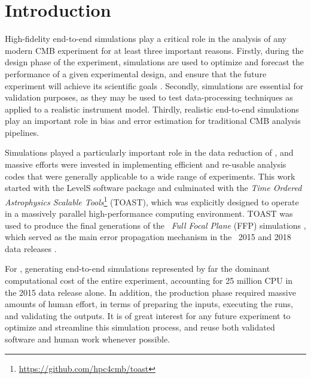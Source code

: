 \documentclass[twocolumn]{aa}%
\begin{document}
\tableofcontents
	


\section{Introduction}
\label{sec:introduction}
	
High-fidelity end-to-end simulations play a critical role in the
analysis of any modern CMB experiment for at least three important
reasons. Firstly, during the design phase of the experiment,
simulations are used to optimize and forecast the performance of a
given experimental design, and ensure that the future experiment will
achieve its scientific goals \citep[e.g.,][]{ptep}. Secondly,
simulations are essential for validation purposes, as they may be used
to test data-processing techniques as applied to a realistic
instrument model. Thirdly, realistic end-to-end simulations play an
important role in bias and error estimation for traditional CMB
analysis pipelines.

Simulations played a particularly important role in the data reduction
of \Planck, and massive efforts were invested in implementing
efficient and re-usable analysis codes that were generally applicable
to a wide range of experiments. This work started with the LevelS software package \citep{levelS} and culminated with the \emph{Time Ordered Astrophysics Scalable Tools}\footnote{\url{https://github.com/hpc4cmb/toast}}
(TOAST), which was
explicitly designed to operate in a massively parallel
high-performance computing environment. TOAST was used to produce the
final generations of the \Planck\ \emph{Full Focal Plane} (FFP)
simulations \citep{planck2014-a14}, which served as the main error
propagation mechanism in the \Planck\ 2015 and 2018 data releases
\citep{planck2014-a01,planck2016-l01}.

For \Planck, generating end-to-end simulations represented by far the
dominant computational cost of the entire experiment, accounting for
25 million CPU in the 2015 data release alone. In addition,
the production phase required massive amounts of human effort, in
terms of preparing the inputs, executing the runs, and validating the
outputs. It is of great interest for any future experiment
to optimize and streamline this simulation process, and reuse both
validated software and human work whenever possible.
\end{document}
